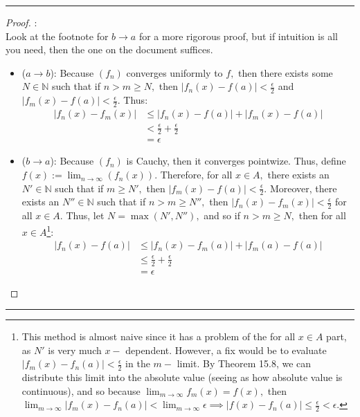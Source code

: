 \documentclass[openany, amssymb, psamsfonts]{amsart}
\newcommand{\bbN}{\mathbb{N}}
\theoremstyle{definition}
\numberwithin{equation}{section}
\begin{document}
\vspace{4pt}     \hrule   \vspace{4pt}\begin{proof}:\\
Look at the footnote for $b\to a$ for a more rigorous proof, but if intuition is all you need, then the one on the document suffices.
\begin{itemize}
    \item ($a\to b$): Because $(f_n)$ converges uniformly to $f,$ then there exists some $N \in \bbN$ such that if $n>m\geq N,$ then $|f_n(x) - f(a)|< \frac{\epsilon}{2}$ and $|f_m(x) - f(a)|< \frac{\epsilon}{2}.$ Thus:
    \begin{align*}
        |f_n(x) - f_m(x)|&\leq |f_n(x) - f(a)| + |f_m(x) - f(a)|\\
        &< \frac{\epsilon}{2} + \frac{\epsilon}{2}\\
        &= \epsilon
    \end{align*}
    \item ($b\to a$): Because $(f_n)$ is Cauchy, then it converges pointwize. Thus, define $f(x):= \displaystyle\lim_{n\to \infty}(f_n(x)).$ Therefore, for all $x\in A,$ there exists an $N' \in \bbN$ such that if $m\geq N',$ then $|f_m(x) - f(a)|< \frac{\epsilon}{2}.$ Moreover, there exists an $N'' \in \bbN$ such that if $n>m\geq N'',$ then $|f_n(x) - f_m(x)|< \frac{\epsilon}{2}$ for all $x\in A.$ Thus, let $N = \max(N',N''),$ and so if $n>m\geq N,$ then for all $x\in A$\footnote{This method is almost naive since it has a problem of the for all $x\in A$ part, as $N'$ is very much $x-$ dependent. However, a fix would be to evaluate $|f_m(x) - f_n(a)|<\frac{\epsilon}{2}$ in the $m-$  limit. By Theorem 15.8, we can distribute this limit into the absolute value (seeing as how absolute value is continuous), and so because $\displaystyle\lim_{m\to \infty}f_m(x) = f(x),$ then $\displaystyle\lim_{m\to \infty}|f_m(x) - f_n(a)|< \displaystyle\lim_{m\to \infty}\epsilon \implies |f(x) - f_n(a)| \leq \frac{\epsilon}{2}<\epsilon.$}: 
    \begin{align*}
        |f_n(x) - f(a)|&\leq |f_n(x) - f_m(a)| + |f_m(a) - f(a)|\\
        &\leq \frac{\epsilon}{2} + \frac{\epsilon}{2}\\
        &= \epsilon
    \end{align*}
    
\end{itemize}
\end{proof}\vspace{4pt}     \hrule   \vspace{4pt}
\end{document}

